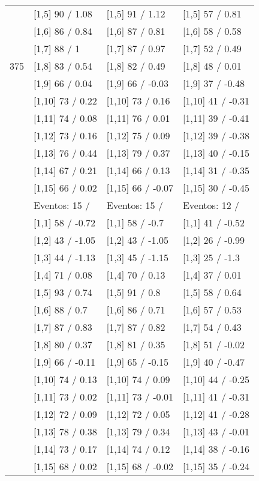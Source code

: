 \begin{table}
\begin{tabular}[t]{llll}
 & {}[1,5] 90  / 1.08 & {}[1,5] 91  / 1.12 & {}[1,5] 57  / 0.81\\
 & {}[1,6] 86  / 0.84 & {}[1,6] 87  / 0.81 & {}[1,6] 58  / 0.58\\
 & {}[1,7] 88  / 1 & {}[1,7] 87  / 0.97 & {}[1,7] 52  / 0.49\\
375 & {}[1,8] 83  / 0.54 & {}[1,8] 82  / 0.49 & {}[1,8] 48  / 0.01\\
\addlinespace
 & {}[1,9] 66  / 0.04 & {}[1,9] 66  / -0.03 & {}[1,9] 37  / -0.48\\
 & {}[1,10] 73  / 0.22 & {}[1,10] 73  / 0.16 & {}[1,10] 41  / -0.31\\
 & {}[1,11] 74  / 0.08 & {}[1,11] 76  / 0.01 & {}[1,11] 39  / -0.41\\
 & {}[1,12] 73  / 0.16 & {}[1,12] 75  / 0.09 & {}[1,12] 39  / -0.38\\
 & {}[1,13] 76  / 0.44 & {}[1,13] 79  / 0.37 & {}[1,13] 40  / -0.15\\
\addlinespace
 & {}[1,14] 67  / 0.21 & {}[1,14] 66  / 0.13 & {}[1,14] 31  / -0.35\\
 & {}[1,15] 66  / 0.02 & {}[1,15] 66  / -0.07 & {}[1,15] 30  / -0.45\\
 & Eventos:  15 / & Eventos:  15 / & Eventos:  12 /\\
 & {}[1,1] 58  / -0.72 & {}[1,1] 58  / -0.7 & {}[1,1] 41  / -0.52\\
 & {}[1,2] 43  / -1.05 & {}[1,2] 43  / -1.05 & {}[1,2] 26  / -0.99\\
\addlinespace
 & {}[1,3] 44  / -1.13 & {}[1,3] 45  / -1.15 & {}[1,3] 25  / -1.3\\
 & {}[1,4] 71  / 0.08 & {}[1,4] 70  / 0.13 & {}[1,4] 37  / 0.01\\
 & {}[1,5] 93  / 0.74 & {}[1,5] 91  / 0.8 & {}[1,5] 58  / 0.64\\
 & {}[1,6] 88  / 0.7 & {}[1,6] 86  / 0.71 & {}[1,6] 57  / 0.53\\
 & {}[1,7] 87  / 0.83 & {}[1,7] 87  / 0.82 & {}[1,7] 54  / 0.43\\
\addlinespace
500 & {}[1,8] 80  / 0.37 & {}[1,8] 81  / 0.35 & {}[1,8] 51  / -0.02\\
 & {}[1,9] 66  / -0.11 & {}[1,9] 65  / -0.15 & {}[1,9] 40  / -0.47\\
 & {}[1,10] 74  / 0.13 & {}[1,10] 74  / 0.09 & {}[1,10] 44  / -0.25\\
 & {}[1,11] 73  / 0.02 & {}[1,11] 73  / -0.01 & {}[1,11] 41  / -0.31\\
 & {}[1,12] 72  / 0.09 & {}[1,12] 72  / 0.05 & {}[1,12] 41  / -0.28\\
\addlinespace
 & {}[1,13] 78  / 0.38 & {}[1,13] 79  / 0.34 & {}[1,13] 43  / -0.01\\
 & {}[1,14] 73  / 0.17 & {}[1,14] 74  / 0.12 & {}[1,14] 38  / -0.16\\
 & {}[1,15] 68  / 0.02 & {}[1,15] 68  / -0.02 & {}[1,15] 35  / -0.24\\
\bottomrule
\end{tabular}
\end{table}
